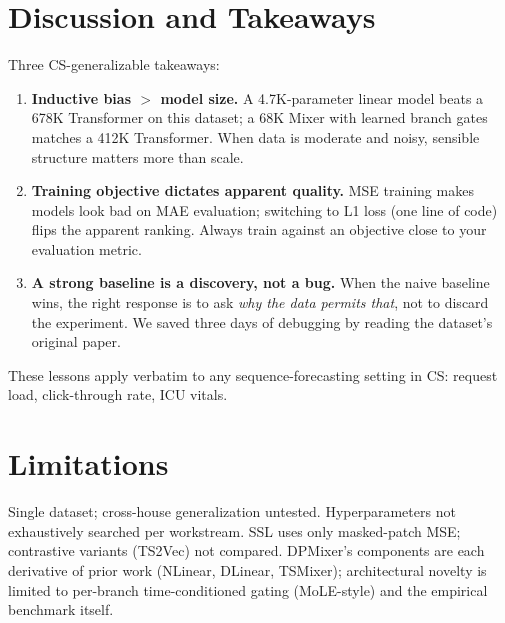 \documentclass[11pt,letterpaper]{article}
\begin{document}
\section{Discussion and Takeaways}

Three CS-generalizable takeaways:

\begin{enumerate}[leftmargin=*,itemsep=2pt]
  \item \textbf{Inductive bias $>$ model size.} A 4.7K-parameter linear
        model beats a 678K Transformer on this dataset; a 68K Mixer with
        learned branch gates matches a 412K Transformer. When data is
        moderate and noisy, sensible structure matters more than scale.
  \item \textbf{Training objective dictates apparent quality.} MSE training
        makes models look bad on MAE evaluation; switching to L1 loss
        (one line of code) flips the apparent ranking. Always train
        against an objective close to your evaluation metric.
  \item \textbf{A strong baseline is a discovery, not a bug.} When the
        naive baseline wins, the right response is to ask \emph{why the
        data permits that}, not to discard the experiment. We saved three
        days of debugging by reading the dataset's original paper.
\end{enumerate}

These lessons apply verbatim to any sequence-forecasting setting in CS:
request load, click-through rate, ICU vitals.

\section{Limitations}

Single dataset; cross-house generalization untested. Hyperparameters not
exhaustively searched per workstream. SSL uses only masked-patch MSE;
contrastive variants (TS2Vec) not compared. DPMixer's components are each
derivative of prior work (NLinear, DLinear, TSMixer); architectural
novelty is limited to per-branch time-conditioned gating (MoLE-style) and
the empirical benchmark itself.

\end{document}
